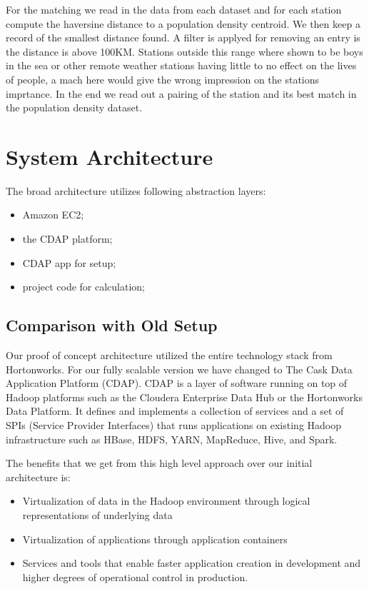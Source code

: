\documentclass[
10pt, %
a4paper, %
oneside, %
headinclude,footinclude, %
useAMS,
usenatbib
]{template/mn2e}  %
\begin{document}
For the matching we read in the data from each dataset and for each station compute the haversine distance to a population density centroid. We then keep a record of the smallest distance found. A filter is applyed for removing an entry is the distance is above 100KM. Stations outside this range where shown to be boys in the sea or other remote weather stations having little to no effect on the lives of people, a mach here would give the wrong impression on the stations imprtance. In the end we read out a pairing of the station and its best match in the population density dataset.

\section{System Architecture}
The broad architecture utilizes following abstraction layers:
\begin{itemize}
\item Amazon EC2;
\item the CDAP platform;
\item CDAP app for setup;
\item project code for calculation;
\end{itemize}


\subsection{Comparison with Old Setup}
Our proof of concept architecture utilized the entire technology stack from Hortonworks. For our fully scalable version we have changed to The Cask Data Application Platform (CDAP). CDAP is a layer of software running on top of Hadoop platforms such as the Cloudera Enterprise Data Hub or the Hortonworks Data Platform. It defines and implements a collection of services and a set of SPIs (Service Provider Interfaces) that runs applications on existing Hadoop infrastructure such as HBase, HDFS, YARN, MapReduce, Hive, and Spark.

The benefits that we get from this high level approach over our initial architecture is:
\begin{itemize}
    \item Virtualization of data in the Hadoop environment through logical representations of underlying data
    \item Virtualization of applications through application containers
    \item Services and tools that enable faster application creation in development and higher degrees of operational control in production.
\end{itemize}
\end{document}
